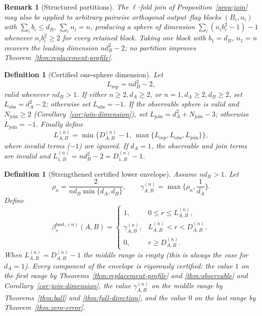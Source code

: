 \documentclass[11pt,a4paper]{article}
\newtheorem{definition}[theorem]{Definition}
\newtheorem{remark}[theorem]{Remark}
\begin{document}
\begin{remark}[Structured partitions]
\label{rem:partitions}
The $\ell$-fold join of Proposition~\ref{prop:join} may also be applied to arbitrary pairwise orthogonal output--flag blocks $(B_i,n_i)$ with $\sum_ib_i\le d_B$, $\sum_in_i=n$, producing a sphere of dimension $\sum_i(n_ib_i^2-1)-1$ whenever $n_ib_i^2\ge2$ for every retained block. Taking one block with $b_1=d_B$, $n_1=n$ recovers the leading dimension $nd_B^2-2$; no partition improves Theorem~\ref{thm:replacement-profile}.
\end{remark}

\begin{definition}[Certified one-sphere dimension]
\label{def:one-sphere}
Let
\[
L_{\mathrm{rep}}=nd_B^2-2,
\]
valid whenever $nd_B>1$. If either $n\ge2,d_A\ge2$, or $n=1,d_A\ge2,d_B\ge2$, set $L_{\mathrm{obs}}=d_A^2-2$; otherwise set $L_{\mathrm{obs}}=-1$. If the observable sphere is valid and $N_{\mathrm{join}}\ge2$ (Corollary~\ref{cor:join-dimension}), set $L_{\mathrm{join}}=d_A^2+N_{\mathrm{join}}-3$; otherwise $L_{\mathrm{join}}=-1$. Finally define
\[
L_{A,B}^{(n)}
=\min\Big\{D_{A,B}^{(n)}-1,\ \max\{L_{\mathrm{rep}},L_{\mathrm{obs}},L_{\mathrm{join}}\}\Big\},
\]
where invalid terms ($-1$) are ignored. If $d_A=1$, the observable and join terms are invalid and $L_{1,B}^{(n)}=nd_B^2-2=D_{1,B}^{(n)}-1$.
\end{definition}

\begin{definition}[Strengthened certified lower envelope]
\label{def:beta-best}
Assume $nd_B>1$. Let
\[
\rho_n=\frac{2}{nd_B\min\{d_A,d_B\}},\qquad
\gamma_{A,B}^{(n)}=\max\Big\{\rho_n,\frac1{d_A}\Big\}.
\]
Define
\[
\beta_r^{\mathrm{best},(n)}(A,B)=
\begin{cases}
1,&0\le r\le L_{A,B}^{(n)},\\[3pt]
\gamma_{A,B}^{(n)},&L_{A,B}^{(n)}<r<D_{A,B}^{(n)},\\[6pt]
0,&r\ge D_{A,B}^{(n)}.
\end{cases}
\]
When $L_{A,B}^{(n)}=D_{A,B}^{(n)}-1$ the middle range is empty (this is always the case for $d_A=1$). Every component of the envelope is rigorously certified: the value $1$ on the first range by Theorems~\ref{thm:replacement-profile} and \ref{thm:observable} and Corollary~\ref{cor:join-dimension}, the value $\gamma_{A,B}^{(n)}$ on the middle range by Theorems~\ref{thm:ball} and \ref{thm:full-direction}, and the value $0$ on the last range by Theorem~\ref{thm:zero-error}.
\end{definition}
\end{document}
